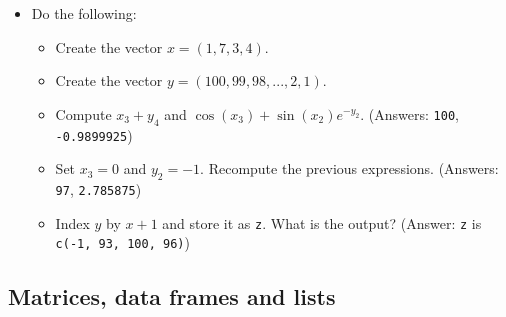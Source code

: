 \documentclass[]{book}
\providecommand{\tightlist}{%
  \setlength{\itemsep}{0pt}\setlength{\parskip}{0pt}}
\newenvironment{rmdblock}[1]
  {\begin{shaded*}
  \begin{itemize}
  \renewcommand{\labelitemi}{
    \raisebox{-.7\height}[0pt][0pt]{
      {\setkeys{Gin}{width=2em,keepaspectratio}\texttt{[image: img/icons/\#1]}}
    }
  }
  \item
  }
  {
  \end{itemize}
  \end{shaded*}
  }
\newenvironment{rmdexercise}
  {\begin{rmdblock}{exercise}}
  {\end{rmdblock}}
\begin{document}
\begin{rmdexercise}
Do the following:

\begin{itemize}
\tightlist
\item
  Create the vector \(x=(1, 7, 3, 4)\).
\item
  Create the vector \(y=(100, 99, 98, ..., 2, 1)\).
\item
  Compute \(x_3+y_4\) and \(\cos(x_3) + \sin(x_2) e^{-y_2}\). (Answers:
  \texttt{100}, \texttt{-0.9899925})
\item
  Set \(x_{3}=0\) and \(y_{2}=-1\). Recompute the previous expressions.
  (Answers: \texttt{97}, \texttt{2.785875})
\item
  Index \(y\) by \(x+1\) and store it as \texttt{z}. What is the output?
  (Answer: \texttt{z} is \texttt{c(-1,\ 93,\ 100,\ 96)})
\end{itemize}
\end{rmdexercise}

\subsection{Matrices, data frames and
lists}\label{matrices-data-frames-and-lists}
\end{document}
